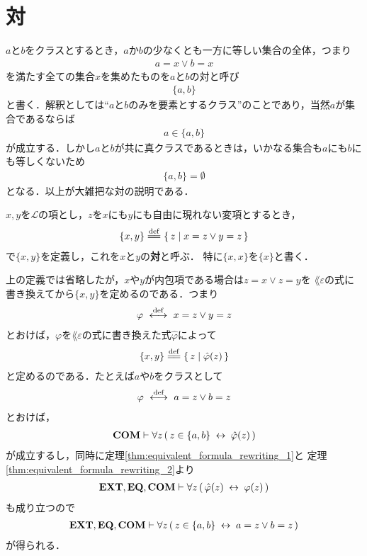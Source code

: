 \section{対}
	$a$と$b$をクラスとするとき，$a$か$b$の少なくとも一方に等しい集合の全体，つまり
	\begin{align}
		a = x \vee b = x
	\end{align}
	を満たす全ての集合$x$を集めたものを$a$と$b$の対と呼び
	\begin{align}
		\{a,b\}
	\end{align}
	と書く．解釈としては``$a$と$b$のみを要素とするクラス''のことであり，当然$a$が集合であるならば
	\begin{align}
		a \in \{a,b\}
	\end{align}
	が成立する．しかし$a$と$b$が共に真クラスであるときは，いかなる集合も$a$にも$b$にも等しくないため
	\begin{align}
		\{a,b\} = \emptyset
	\end{align}
	となる．以上が大雑把な対の説明である．
	
	\begin{screen}
		\begin{dfn}[対]
			$x,y$を$\mathcal{L}$の項とし，$z$を$x$にも$y$にも自由に現れない変項とするとき，
			\begin{align}
				\{x,y\} \defeq \Set{z}{x = z \vee y = z}
			\end{align}
			で$\{x,y\}$を定義し，これを$x$と$y$の{\bf 対}と呼ぶ．
			特に$\{x,x\}$を$\{x\}$と書く．
		\end{dfn}
	\end{screen}
	
	上の定義では省略したが，$x$や$y$が内包項である場合は$z = x \vee z = y$を
	$\lang{\varepsilon}$の式に書き換えてから$\{x,y\}$を定めるのである．つまり
	\begin{align}
		\varphi \ \overset{\mathrm{def}}{\longleftrightarrow}\  x = z \vee y = z
	\end{align}
	とおけば，$\varphi$を$\lang{\varepsilon}$の式に書き換えた式$\hat{\varphi}$によって
	\begin{align}
		\{x,y\} \defeq \Set{z}{\hat{\varphi}(z)}
	\end{align}
	と定めるのである．たとえば$a$や$b$をクラスとして
	\begin{align}
		\varphi \ \overset{\mathrm{def}}{\longleftrightarrow}\  a = z \vee b = z
	\end{align}
	とおけば，
	\begin{align}
		\mbox{\bf COM} \vdash \forall z\, (\, z \in \{a,b\} \hspace{0.25em}\leftrightarrow\hspace{0.25em} \hat{\varphi}(z)\, )
	\end{align}
	が成立するし，同時に定理\ref{thm:equivalent_formula_rewriting_1}と
	定理\ref{thm:equivalent_formula_rewriting_2}より
	\begin{align}
		\mbox{{\bf EXT}},\mbox{{\bf EQ}},\mbox{\bf COM} \vdash 
		\forall z\, (\, \hat{\varphi}(z) \hspace{0.25em}\leftrightarrow\hspace{0.25em} \varphi(z)\, )
	\end{align}
	も成り立つので
	\begin{align}
		\mbox{{\bf EXT}},\mbox{{\bf EQ}},\mbox{\bf COM} \vdash 
		\forall z\, (\, z \in \{a,b\} \hspace{0.25em}\leftrightarrow\hspace{0.25em} a = z \vee b = z\, )
	\end{align}
	が得られる．
	
